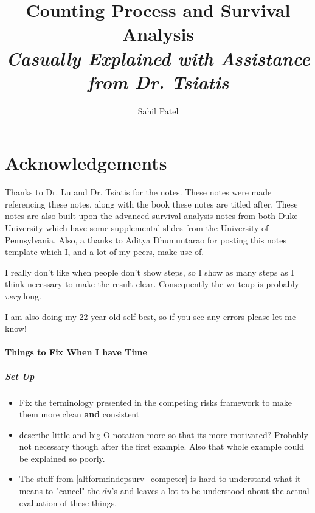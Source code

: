 \documentclass[10pt]{article}
\begin{document}
	\title{{Counting Process and Survival Analysis}\\{\normalsize{\itshape Casually Explained with Assistance from Dr. Tsiatis}}}
	\author{Sahil Patel}
	\maketitle
	\newpage

        \part{Acknowledgements}
        Thanks to Dr. Lu and Dr. Tsiatis for the notes. These notes were made referencing these notes, along with the book these notes are titled after. These notes are also built upon the advanced survival analysis notes from both Duke University which have some supplemental slides from the University of Pennsylvania. Also, a thanks to Aditya Dhumuntarao for posting this notes template which I, and a lot of my peers, make use of.

        I really don't like when people don't show steps, so I show as many steps as I think necessary to make the result clear. Consequently the writeup is probably \textit{very} long.

        I am also doing my 22-year-old-self best, so if you see any errors please let me know!

        \subsection{Things to Fix When I have Time}
        \subsubsection{Set Up}
        \begin{itemize}
            \item Fix the terminology presented in the competing risks framework to make them more clean \textbf{and} consistent
            \item describe little and big O notation more so that its more motivated? Probably not necessary though after the first example. Also that whole example could be explained so poorly.
            \item The stuff from \cref{altform:indepsurv_competer} is hard to understand what it means to "cancel" the $du$'s and leaves a lot to be understood about the actual evaluation of these things.
        \end{itemize}
\end{document}
